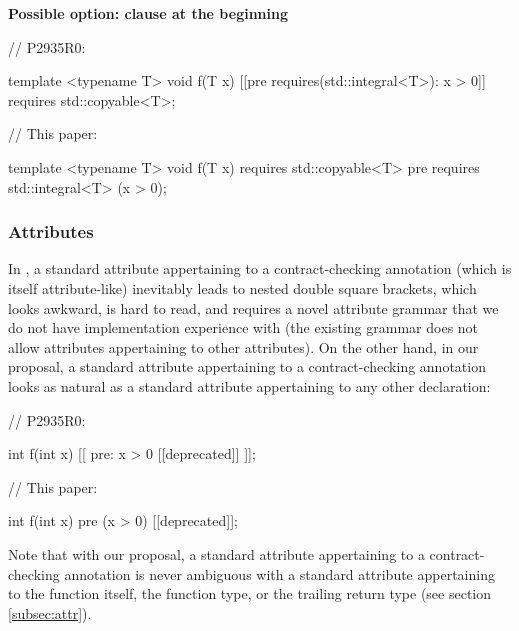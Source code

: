 \textbf{Possible option:  clause at the beginning}

\begin{minipage}[t]{8cm}
\begin{codeblock}
// P2935R0:

  template <typename T>
  void f(T x)
    [[pre requires(std::integral<T>): x > 0]]
    requires std::copyable<T>;
\end{codeblock}
\end{minipage}
\begin{minipage}[t]{8cm}
\begin{codeblock}
// This paper:

  template <typename T>
  void f(T x)
    requires std::copyable<T>
    pre requires std::integral<T> (x > 0);
\end{codeblock}
\end{minipage}

\subsubsection{Attributes}

In \cite{P2935R0}, a standard attribute appertaining to a contract-checking annotation (which is itself attribute-like) inevitably leads to nested double square brackets, which looks awkward, is hard to read, and requires a novel attribute grammar that we do not have implementation experience with (the existing grammar does not allow attributes appertaining to other attributes). On the other hand, in our proposal, a standard attribute appertaining to a contract-checking annotation looks as natural as a standard attribute appertaining to any other declaration:

\begin{minipage}[t]{8cm}
\begin{codeblock}
// P2935R0:

int f(int x) 
  [[ pre: x > 0 [[deprecated]] ]];
\end{codeblock}
\end{minipage}
\begin{minipage}[t]{8cm}
\begin{codeblock}
// This paper:

int f(int x) 
  pre (x > 0) [[deprecated]];
\end{codeblock}
\end{minipage}
\vspace{5mm}

Note that with our proposal, a standard attribute appertaining to a contract-checking annotation is never ambiguous with a standard attribute appertaining to the function itself, the function type, or the trailing return type (see section \ref{subsec:attr}).

